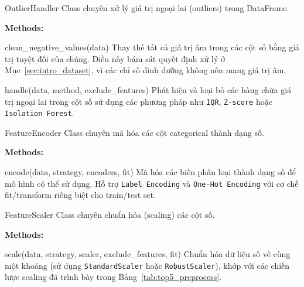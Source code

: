 \documentclass[12pt,a4paper]{article}
\newenvironment{methodlist}{
    \begin{description}[style=nextline, font=\ttfamily\color{sklearn-blue}]
}{
    \end{description}
}
\begin{document}
\begin{classbox}{OutlierHandler}
Class chuyên xử lý giá trị ngoại lai (outliers) trong DataFrame.

\vspace{0.2cm}
\textbf{Methods:}
\begin{methodlist}
    \item[clean\_negative\_values(data)] 
    Thay thế tất cả giá trị âm trong các cột số bằng giá trị tuyệt đối của chúng. 
    Điều này bám sát quyết định xử lý ở Mục~\ref{sec:intro_dataset}, vì các chỉ số dinh dưỡng không nên mang giá trị âm.
    
    \item[handle(data, method, exclude\_features)] 
    Phát hiện và loại bỏ các hàng chứa giá trị ngoại lai trong cột số sử dụng các phương pháp như \texttt{IQR}, \texttt{Z-score} hoặc \texttt{Isolation Forest}.
\end{methodlist}
\end{classbox}

\begin{classbox}{FeatureEncoder}
Class chuyên mã hóa các cột categorical thành dạng số.

\vspace{0.2cm}
\textbf{Methods:}
\begin{methodlist}
    \item[encode(data, strategy, encoders, fit)] 
    Mã hóa các biến phân loại thành dạng số để mô hình có thể sử dụng. Hỗ trợ \texttt{Label Encoding} và \texttt{One-Hot Encoding} với cơ chế fit/transform riêng biệt cho train/test set.
\end{methodlist}
\end{classbox}

\begin{classbox}{FeatureScaler}
Class chuyên chuẩn hóa (scaling) các cột số.

\vspace{0.2cm}
\textbf{Methods:}
\begin{methodlist}
    \item[scale(data, strategy, scaler, exclude\_features, fit)] 
    Chuẩn hóa dữ liệu số về cùng một khoảng (sử dụng \texttt{StandardScaler} hoặc \texttt{RobustScaler}), khớp với các chiến lược scaling đã trình bày trong Bảng~\ref{tab:top5_preprocess}.
\end{methodlist}
\end{classbox}
\end{document}
